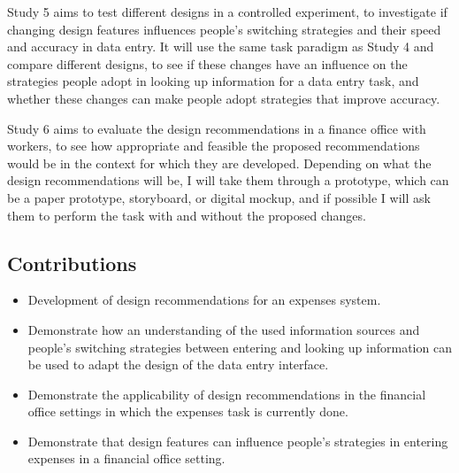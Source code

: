 Study 5 aims to test different designs in a controlled experiment, to investigate if changing design features influences people's switching strategies and their speed and accuracy in data entry. It will use the same task paradigm as Study 4 and compare different designs, to see if these changes have an influence on the strategies people adopt in looking up information for a data entry task, and whether these changes can make people adopt strategies that improve accuracy. 

Study 6 aims to evaluate the design recommendations in a finance office with workers, to see how appropriate and feasible the proposed recommendations would be in the context for which they are developed. Depending on what the design recommendations will be, I will take them through a prototype, which can be a paper prototype, storyboard, or digital mockup, and if possible I will ask them to perform the task with and without the proposed changes. 

\subsection{Contributions}
\begin{itemize}
\item
Development of design recommendations for an expenses system.
\item
Demonstrate how an understanding of the used information sources and people's switching strategies between entering and looking up information can be used to adapt the design of the data entry interface. 
\item
Demonstrate the applicability of design recommendations in the financial office settings in which the expenses task is currently done. 
\item
Demonstrate that design features can influence people's strategies in entering expenses in a financial office setting.
\end{itemize}

